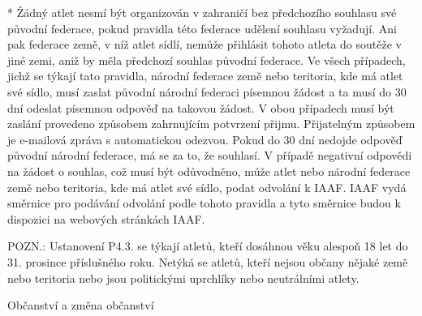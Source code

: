 * Žádný atlet nesmí být organizován v zahraničí bez předchozího souhlasu své původní federace, pokud pravidla této federace udělení souhlasu vyžadují.  Ani pak federace země, v níž atlet sídlí, nemůže přihlásit tohoto atleta do soutěže v jiné zemi, aniž by měla předchozí souhlas původní federace. Ve všech případech, jichž se týkají tato pravidla, národní federace země nebo teritoria, kde má atlet své sídlo, musí zaslat původní národní federaci písemnou žádost a ta musí do 30 dní odeslat písemnou odpověď na takovou žádost. V obou případech musí být zaslání provedeno způsobem zahrnujícím potvrzení přijmu. Přijatelným způsobem je e-mailová zpráva s automatickou odezvou. Pokud do 30 dní nedojde odpověď původní národní federace, má se za to, že souhlasí. V případě negativní odpovědi na žádost o souhlas, což musí být odůvodněno, může atlet nebo národní federace země nebo teritoria, kde má atlet své sídlo, podat odvolání k IAAF. IAAF vydá směrnice pro podávání odvolání podle tohoto pravidla a tyto směrnice budou k dispozici na webových stránkách IAAF.
\enditems

POZN.: Ustanovení P4.3. se týkají atletů, kteří dosáhnou věku alespoň 18 let do 31. prosince příslušného roku.
Netýká se atletů, kteří nejsou občany nějaké země nebo teritoria nebo jsou politickými uprchlíky nebo neutrálními atlety.

\secc Občanství a změna občanství


